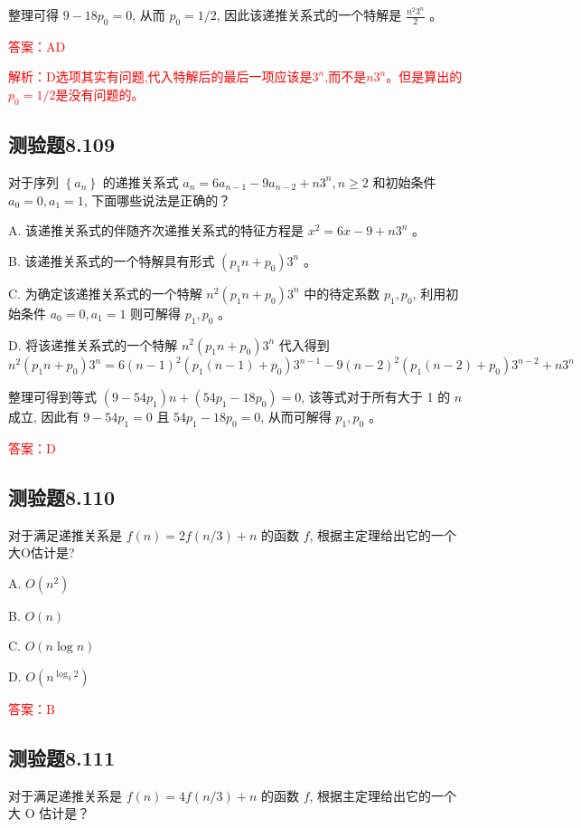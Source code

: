 \documentclass[UTF8, heading=true]{ctexart}
\begin{document}
整理可得 $9-18 p_0=0$, 从而 $p_0=1 / 2$, 因此该递推关系式的一个特解是 $\frac{n^2 3^n}{2}$ 。

\textcolor{red}{答案：AD}

\textcolor{red}{解析：D选项其实有问题,代入特解后的最后一项应该是$3^n$,而不是$n3^n$。但是算出的$p_0=1/2$是没有问题的。}


\subsection{测验题8.109}

对于序列 $\left\{a_n\right\}$ 的递推关系式 $a_n=6 a_{n-1}-9 a_{n-2}+n 3^n, n \geq 2$ 和初始条件 $a_0=0, a_1=1$, 下面哪些说法是正确的？

A. 该递推关系式的伴随齐次递推关系式的特征方程是 $x^2=6 x-9+n 3^n$ 。

B. 该递推关系式的一个特解具有形式 $\left(p_1 n+p_0\right) 3^n$ 。

C. 为确定该递推关系式的一个特解 $n^2\left(p_1 n+p_0\right) 3^n$ 中的待定系数 $p_1, p_0$, 利用初始条件 $a_0=0, a_1=1$ 则可解得 $p_1, p_0$ 。

D. 将该递推关系式的一个特解 $n^2\left(p_1 n+p_0\right) 3^n$ 代入得到
$$
n^2\left(p_1 n+p_0\right) 3^n=6(n-1)^2\left(p_1(n-1)+p_0\right) 3^{n-1}-9(n-2)^2\left(p_1(n-2)+p_0\right) 3^{n-2}+n 3^n
$$

整理可得到等式 $\left(9-54 p_1\right) n+\left(54 p_1-18 p_0\right)=0$, 该等式对于所有大于 1 的 $n$ 成立, 因此有 $9-54 p_1=0$ 且 $54 p_1-18 p_0=0$, 从而可解得 $p_1, p_0$ 。


\textcolor{red}{答案：D}

\subsection{测验题8.110}

对于满足递推关系是 $f(n)=2 f(n / 3)+n$ 的函数 $f$, 根据主定理给出它的一个大O估计是?

A. $O\left(n^2\right)$

B. $O(n)$

C. $O(n \log n)$

D. $O\left(n^{\log _3 2}\right)$

\textcolor{red}{答案：B}

\subsection{测验题8.111}

对于满足递推关系是 $f(n)=4 f(n / 3)+n$ 的函数 $f$, 根据主定理给出它的一个大 O 估计是？
\end{document}

